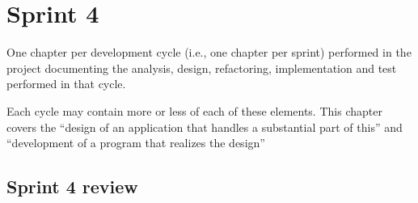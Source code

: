 \chapter{Sprint 4}

One chapter per development cycle (i.e., one chapter per sprint) performed in the project documenting the analysis, design, refactoring, implementation and test performed in that cycle.

Each cycle may contain more or less of each of these elements.
This chapter covers the “design of an application that handles a substantial part of this” and “development of a program that realizes the design”





\section{Sprint 4 review}